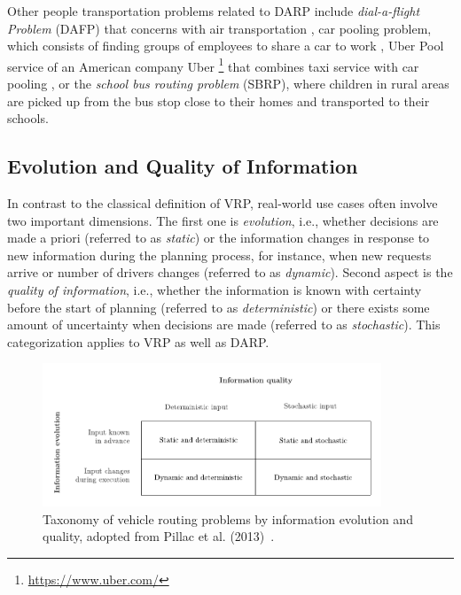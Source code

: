 Other people transportation problems related to DARP include \emph{dial-a-flight Problem} (DAFP) that concerns with air transportation \cite{PILLAC20131}, car pooling problem, which consists of finding groups of employees to share a car to work \cite{toth2015vrp}, Uber Pool service of an American company Uber \footnote{\url{https://www.uber.com/}} that combines taxi service with car pooling \cite{uber-pool}, or the \emph{school bus routing problem} (SBRP), where children in rural areas are picked up from the bus stop close to their homes and transported to their schools.


\subsection{Evolution and Quality of Information} \label{sec:evolution}

In contrast to the classical definition of VRP, real-world use cases often involve two important dimensions. The first one is \emph{evolution}, i.e., whether decisions are made a priori (referred to as \emph{static}) or the information changes in response to new information during the planning process, for instance, when new requests arrive or number of drivers changes (referred to as \emph{dynamic}). Second aspect is the \emph{quality of information}, i.e., whether the information is known with certainty before the start of planning (referred to as \emph{deterministic}) or there exists some amount of uncertainty when decisions are made (referred to as \emph{stochastic}). This categorization applies to VRP as well as DARP. \cite{PILLAC20131, darp-survey}

	\begin{figure}[!ht]
		\centering
		\includegraphics[width=0.9\textwidth]{figures/static-stochastic-table.pdf}
		\caption[Taxonomy of vehicle routing problems by information evolution and quality.]{Taxonomy of vehicle routing problems by information evolution and quality, adopted from Pillac et al. (2013)~\cite[p.~2~(modified)]{PILLAC20131}.}
		\label{fig:static-stochastic-table}
	\end{figure}

